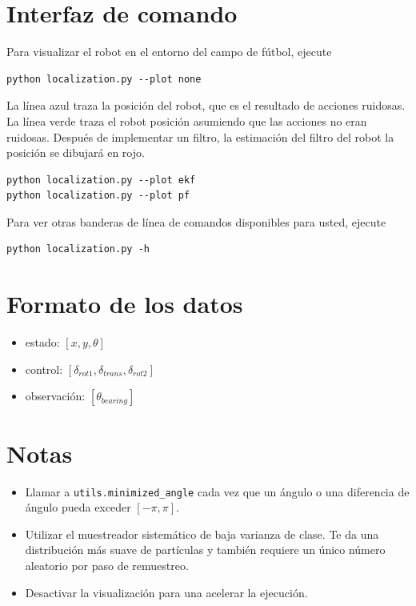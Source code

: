 \documentclass[tp]{lcc}
\begin{document}
	\section{Interfaz de comando}

	Para visualizar el robot en el entorno del campo de fútbol, ejecute
	
\begin{lstlisting}[style=bash] 
python localization.py --plot none
\end{lstlisting}

	
	La línea azul traza la posición del robot, que es el resultado de acciones ruidosas. La línea verde traza el robot posición asumiendo que las acciones no eran ruidosas. Después de implementar un filtro, la estimación del filtro del robot la posición se dibujará en rojo.
	
	
\begin{lstlisting}[style=bash] 
python localization.py --plot ekf
python localization.py --plot pf
\end{lstlisting}

Para ver otras banderas de línea de comandos disponibles para usted, ejecute

\begin{lstlisting}[style=bash] 
python localization.py -h
\end{lstlisting}

\section{Formato de los datos}

\begin{itemize}
	\item estado: $[x,y,\theta]$
	\item control: $[\delta_{rot1},\delta_{trans},\delta_{rot2}]$
	\item observación: $[\theta_{bearing}]$
\end{itemize}

\section{Notas}
\begin{itemize}
	\item Llamar a \lstinline[style=bash]{utils.minimized_angle} cada vez que un ángulo o una diferencia de ángulo pueda exceder $[-\pi, \pi]$.
	\item Utilizar el muestreador sistemático de baja varianza de clase. Te da una distribución más suave de partículas y también requiere un único número aleatorio por paso de remuestreo.
	\item Desactivar la visualización para una acelerar la ejecución.
\end{itemize}
\end{document}
